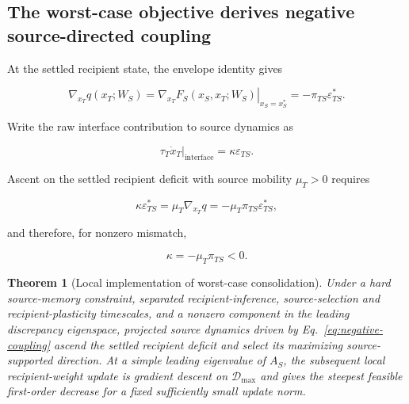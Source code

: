 \documentclass[10pt,letterpaper]{article}
\theoremstyle{plain}
\newtheorem{theorem}{Theorem}
\theoremstyle{remark}
\begin{document}
\subsection{The worst-case objective derives negative source-directed coupling}

At the settled recipient state, the envelope identity gives

\begin{equation}
\nabla_{x_T}q(x_T;W_S)=\left.\nabla_{x_T}F_S(x_S,x_T;W_S)\right|_{x_S=x_S^*}=-\pi_{TS}\varepsilon_{TS}^*.
\label{eq:teacher-envelope}
\end{equation}

Write the raw interface contribution to source dynamics as

\begin{equation}
\tau_T\dot x_T\big|_{\mathrm{interface}}=\kappa\varepsilon_{TS}.
\label{eq:teacher-interface}
\end{equation}

Ascent on the settled recipient deficit with source mobility $\mu_T>0$ requires

\begin{equation}
\kappa\varepsilon_{TS}^*=\mu_T\nabla_{x_T}q=-\mu_T\pi_{TS}\varepsilon_{TS}^*,
\end{equation}

and therefore, for nonzero mismatch,

\begin{equation}
\boxed{\kappa=-\mu_T\pi_{TS}<0.}
\label{eq:negative-coupling}
\end{equation}


\begin{theorem}[Local implementation of worst-case consolidation]
\label{thm:minimax-transfer}
Under a hard source-memory constraint, separated recipient-inference, source-selection and recipient-plasticity timescales, and a nonzero component in the leading discrepancy eigenspace, projected source dynamics driven by Eq.~\ref{eq:negative-coupling} ascend the settled recipient deficit and select its maximizing source-supported direction. At a simple leading eigenvalue of $A_S$, the subsequent local recipient-weight update is gradient descent on $\mathcal D_{\max}$ and gives the steepest feasible first-order decrease for a fixed sufficiently small update norm.
\end{theorem}
\end{document}
